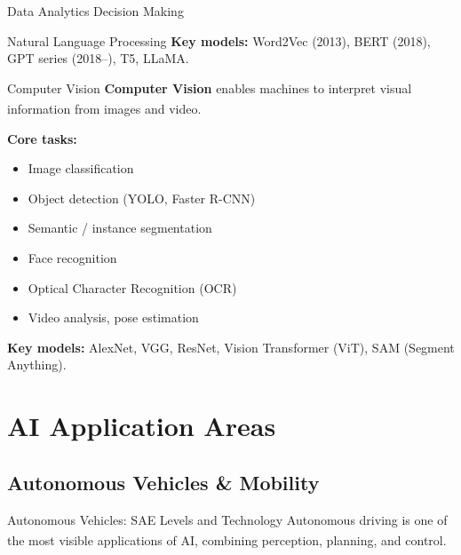 \begin{v3topic}{Data Analytics Decision Making}
\begin{v3topic}{Natural Language Processing}
        \textbf{Key models:} Word2Vec (2013), BERT (2018), GPT series (2018--), T5, LLaMA.

\end{v3topic}
\begin{v3topic}{Computer Vision}
        \textbf{Computer Vision} enables machines to interpret visual information from images and video.\textsuperscript{\cite{adjaouteAI2024}}

        \textbf{Core tasks:}
        \begin{itemize}
            \item Image classification
            \item Object detection (YOLO, Faster R-CNN)
            \item Semantic / instance segmentation
            \item Face recognition
            \item Optical Character Recognition (OCR)
            \item Video analysis, pose estimation
        \end{itemize}

        \textbf{Key models:} AlexNet, VGG, ResNet, Vision Transformer (ViT), SAM (Segment Anything).
\end{v3topic}

    \section{AI Application Areas}
    \subsection{Autonomous Vehicles \& Mobility}

\begin{v3topic}{Autonomous Vehicles: SAE Levels and Technology}
        Autonomous driving is one of the most visible applications of AI, combining perception, planning, and control.\textsuperscript{\cite{adjaouteAI2024}}


\end{v3topic}
\end{v3topic}
